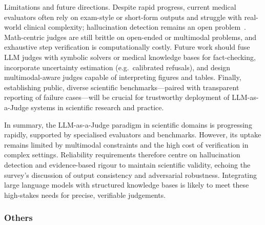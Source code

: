 Limitations and future directions.  Despite rapid progress, current medical evaluators often rely on exam-style or short-form outputs and struggle with real-world clinical complexity; hallucination detection remains an open problem~\cite{medhelm2024}. Math-centric judges are still brittle on open-ended or multimodal problems, and exhaustive step verification is computationally costly. Future work should fuse LLM judges with symbolic solvers or medical knowledge bases for fact-checking, incorporate uncertainty estimation (e.g.\ calibrated refusals), and design multimodal-aware judges capable of interpreting figures and tables. Finally, establishing public, diverse scientific benchmarks—paired with transparent reporting of failure cases—will be crucial for trustworthy deployment of LLM-as-a-Judge systems in scientific research and practice.

In summary, the LLM-as-a-Judge paradigm in scientific domains is progressing rapidly, supported by specialised evaluators and benchmarks. However, its uptake remains limited by multimodal constraints and the high cost of verification in complex settings. Reliability requirements therefore centre on hallucination detection and evidence-based rigour to maintain scientific validity, echoing the survey’s discussion of output consistency and adversarial robustness. Integrating large language models with structured knowledge bases is likely to meet these high-stakes needs for precise, verifiable judgements.

\subsubsection{\textbf{Others}}

